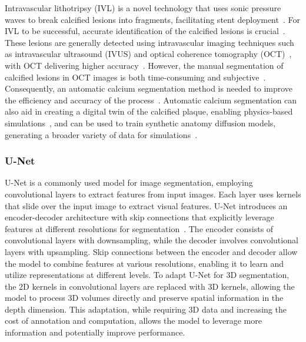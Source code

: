 \documentclass[a4paper,11pt,oneside]{report}
\begin{document}
Intravascular lithotripsy (IVL) is a novel technology that uses sonic pressure waves to break calcified lesions into fragments, facilitating stent deployment~\cite{Butt2023}. For IVL to be successful, accurate identification of the calcified lesions is crucial~\cite{Butt2023}. These lesions are generally detected using intravascular imaging techniques such as intravascular ultrasound (IVUS) and optical coherence tomography (OCT)~\cite{Butt2023}, with OCT delivering higher accuracy~\cite{Fujimoto2003, Costopoulos2016}. However, the manual segmentation of calcified lesions in OCT images is both time-consuming and subjective~\cite{Segars2013, Oktay2020, Carpenter2022}. Consequently, an automatic calcium segmentation method is needed to improve the efficiency and accuracy of the process~\cite{Carpenter2022}. Automatic calcium segmentation can also aid in creating a digital twin of the calcified plaque, enabling physics-based simulations~\cite{Karanasiou2020, Poletti2022}, and can be used to train synthetic anatomy diffusion models, generating a broader variety of data for simulations~\cite{Kadry2024, Kadry2024ProbingDiffusion}.

\subsubsection{U-Net}
U-Net is a commonly used model for image segmentation, employing convolutional layers to extract features from input images. Each layer uses kernels that slide over the input image to extract visual features. U-Net introduces an encoder-decoder architecture with skip connections that explicitly leverage features at different resolutions for segmentation~\cite{Ronneberger2015}. The encoder consists of convolutional layers with downsampling, while the decoder involves convolutional layers with upsampling. Skip connections between the encoder and decoder allow the model to combine features at various resolutions, enabling it to learn and utilize representations at different levels. To adapt U-Net for 3D segmentation, the 2D kernels in convolutional layers are replaced with 3D kernels, allowing the model to process 3D volumes directly and preserve spatial information in the depth dimension. This adaptation, while requiring 3D data and increasing the cost of annotation and computation, allows the model to leverage more information and potentially improve performance.
\end{document}
